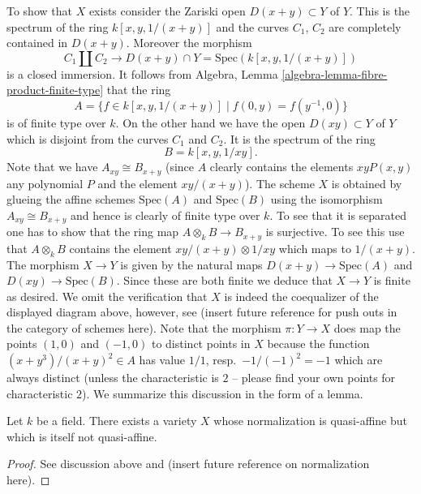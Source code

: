 \medskip\noindent
To show that $X$ exists consider the Zariski open
$D(x + y) \subset Y$ of $Y$. This is the spectrum
of the ring
$k[x, y, 1/(x + y)]$
and the curves $C_1$, $C_2$ are completely contained in
$D(x + y)$. Moreover the morphism
$$
C_1 \coprod C_2
\longrightarrow
D(x + y) \cap Y = \text{Spec}(k[x, y, 1/(x + y)])
$$
is a closed immersion. It follows from
Algebra, Lemma \ref{algebra-lemma-fibre-product-finite-type}
that the ring
$$
A =
\{f \in k[x, y, 1/(x + y)] \mid f(0, y) = f(y^{-1}, 0)\}
$$
is of finite type over $k$. On the other hand we have the open
$D(xy) \subset Y$ of $Y$ which is disjoint from the curves $C_1$
and $C_2$. It is the spectrum of the ring
$$
B = k[x, y, 1/xy].
$$
Note that we have $A_{xy} \cong B_{x + y}$ (since $A$ clearly contains
the elements $xyP(x, y)$ any polynomial $P$ and the element $xy/(x + y)$).
The scheme $X$ is obtained by glueing the affine schemes
$\text{Spec}(A)$ and $\text{Spec}(B)$ using the isomorphism
$A_{xy} \cong B_{x + y}$ and hence is clearly of finite type over
$k$. To see that it is separated one has to show that the
ring map $A \otimes_k B \to B_{x + y}$ is surjective. To see
this use that $A \otimes_k B$ contains the element
$xy/(x + y) \otimes 1/xy$ which maps to $1/(x + y)$.
The morphism $X \to Y$ is given by the natural maps
$D(x + y) \to \text{Spec}(A)$ and $D(xy) \to \text{Spec}(B)$.
Since these are both finite we deduce that $X \to Y$ is finite
as desired. We omit the verification that $X$ is indeed the
coequalizer of the displayed diagram above, however, see
(insert future reference for push outs in the category of schemes
here). Note that the morphism $\pi : Y \to X$ does
map the points  $(1, 0)$
and $(-1, 0)$ to distinct points in $X$ because the
function $(x + y^3)/(x + y)^2 \in A$ has value
$1/1$, resp.\ $-1/(-1)^2 = -1$ which are always distinct
(unless the characteristic is $2$ -- please find your own points
for characteristic $2$). We summarize this discussion in the
form of a lemma.

\begin{lemma}
\label{lemma-quasi-affine-normalization-not-quasi-affine}
Let $k$ be a field.
There exists a variety $X$ whose normalization is quasi-affine but
which is itself not quasi-affine.
\end{lemma}

\begin{proof}
See discussion above and (insert future reference on normalization here).
\end{proof}












